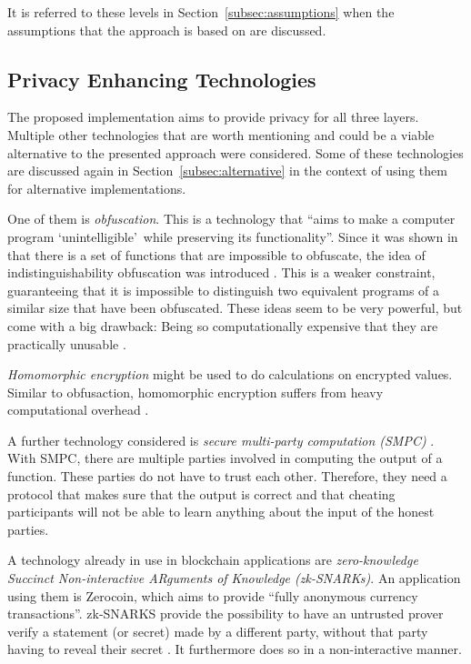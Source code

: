 \documentclass[runningheads]{llncs}
\newcommand{\refsec}[1]{Section~\ref{#1}}
\newcommand{\quotel}{``}
\newcommand{\quoter}{''}
\begin{document}
It is referred to these levels in \refsec{subsec:assumptions} when the assumptions that the approach is based on are discussed.




\subsection{Privacy Enhancing Technologies} \label{subsec:technologies}

The proposed implementation aims to provide privacy for all three layers. Multiple other technologies that are worth mentioning and could be a viable alternative to the presented approach were considered. Some of these technologies are discussed again in \refsec{subsec:alternative} in the context of using them for alternative implementations.


One of them is \textit{obfuscation}. This is a technology that \quotel aims to make a computer program `unintelligible'\ while preserving its functionality\quoter  \cite{garg2016candidate}. Since it was shown in that there is a set of functions that are impossible to obfuscate, the idea of indistinguishability obfuscation  was introduced \cite{barak2001possibility,barak2012possibility}. This is a weaker constraint, guaranteeing that it is impossible to distinguish two equivalent programs of a similar size that have been obfuscated. These ideas seem to be very powerful, but come with a big drawback: Being so computationally expensive that they are practically unusable \cite{banescu2015idea}.

\textit{Homomorphic encryption} might be used to do calculations on encrypted values. Similar to obfusaction, homomorphic encryption suffers from heavy computational overhead \cite{gentry2010computing}.


A further technology considered is \textit{secure multi-party computation (SMPC)} \cite{orlandi2011multiparty}. With SMPC, there are multiple parties involved in computing the output of a function. These parties do not have to trust each other. Therefore, they need a protocol that makes sure that the output is correct and that cheating participants will not be able to learn anything about the input of the honest parties. 


A technology already in use in blockchain applications are \textit{zero-knowledge Succinct Non-interactive ARguments of Knowledge (zk-SNARKs)}. An application using them is Zerocoin, which aims to provide  \quotel fully anonymous currency transactions\quoter  \cite{miers2013zerocoin}. zk-SNARKS provide the possibility to have an untrusted prover verify a statement (or secret) made by a different party, without that party having to reveal their secret \cite{ben2013snarks}. It furthermore does so in a non-interactive manner. 
\end{document}
